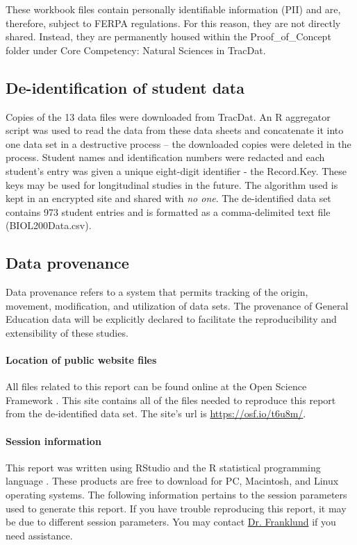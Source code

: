 \documentclass[fleqn,10pt]{SelfArx}\usepackage[]{graphicx}\usepackage[]{color}
\begin{document}
These workbook files contain personally identifiable information (PII) and are, therefore, subject to FERPA regulations. For this reason, they are not directly shared. Instead, they are permanently housed within the Proof\_of\_Concept folder under Core Competency: Natural Sciences in TracDat.

\subsection{De-identification of student data}
Copies of the 13 data files were downloaded from TracDat. An R aggregator script was used to read the data from these data sheets and concatenate it into one data set in a destructive process -- the downloaded copies were deleted in the process. Student names and identification numbers were redacted and each student's entry was given a unique eight-digit identifier - the Record.Key. These keys may be used for longitudinal studies in the future. The algorithm used is kept in an encrypted site and shared with \textit{no one}. The de-identified data set contains 973 student entries and is formatted as a comma-delimited text file (BIOL200Data.csv).

\subsection{Data provenance}
Data provenance refers to a system that permits tracking of the origin, movement, modification, and utilization of data sets\citep{Buneman2001}. The provenance of General Education data will be explicitly declared to facilitate the reproducibility and extensibility of these studies.

\paragraph{Location of public website files}
All files related to this report can be found online at the Open Science Framework \citep{Nosek2012}. This site contains all of the files needed to reproduce this report from the de-identified data set. The site's url is \href{https://osf.io/t6u8m/}{https://osf.io/t6u8m/}.

\paragraph{Session information}
This report was written using RStudio \citep{Rstudio} and the R statistical programming language \citep{R}. These products are free to download for PC, Macintosh, and Linux operating systems. The following information pertains to the session parameters used to generate this report. If you have trouble reproducing this report, it may be due to different session parameters. You may contact \href{mailto:CliftonFranklund@ferris.edu}{Dr. Franklund} if you need assistance.
\end{document}
